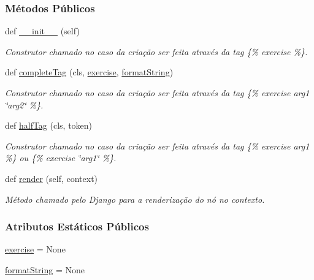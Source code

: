 \subsubsection*{Métodos Públicos}
\begin{DoxyCompactItemize}
\item 
def \hyperlink{classCourse_1_1templatetags_1_1exercises_1_1ExerciseToken_af86633b72541f29c7672473931c6725b}{\+\_\+\+\_\+init\+\_\+\+\_\+} (self)
\begin{DoxyCompactList}\small\item\em Construtor chamado no caso da criação ser feita através da tag \{\% exercise \%\}. \end{DoxyCompactList}\item 
def \hyperlink{classCourse_1_1templatetags_1_1exercises_1_1ExerciseToken_a090f58f2ed560ef73c1a859ed1a7c8e3}{complete\+Tag} (cls, \hyperlink{classCourse_1_1templatetags_1_1exercises_1_1ExerciseToken_a7051cf9758ec633ad62d57161d73c852}{exercise}, \hyperlink{classCourse_1_1templatetags_1_1exercises_1_1ExerciseToken_ae15b200ce6e26966169799ea67b67bcd}{format\+String})
\begin{DoxyCompactList}\small\item\em Construtor chamado no caso da criação ser feita através da tag \{\% exercise arg1 \char`\"{}arg2\char`\"{} \%\}. \end{DoxyCompactList}\item 
def \hyperlink{classCourse_1_1templatetags_1_1exercises_1_1ExerciseToken_a09add50afe0ff8c688c555da566137d7}{half\+Tag} (cls, token)
\begin{DoxyCompactList}\small\item\em Construtor chamado no caso da criação ser feita através da tag \{\% exercise arg1 \%\} ou \{\% exercise \char`\"{}arg1\char`\"{} \%\}. \end{DoxyCompactList}\item 
def \hyperlink{classCourse_1_1templatetags_1_1exercises_1_1ExerciseToken_af53c156486c9175af84cd003285aa95e}{render} (self, context)
\begin{DoxyCompactList}\small\item\em Método chamado pelo Django para a renderização do nó no contexto. \end{DoxyCompactList}\end{DoxyCompactItemize}
\subsubsection*{Atributos Estáticos Públicos}
\begin{DoxyCompactItemize}
\item 
\hyperlink{classCourse_1_1templatetags_1_1exercises_1_1ExerciseToken_a7051cf9758ec633ad62d57161d73c852}{exercise} = None
\item 
\hyperlink{classCourse_1_1templatetags_1_1exercises_1_1ExerciseToken_ae15b200ce6e26966169799ea67b67bcd}{format\+String} = None
\end{DoxyCompactItemize}


